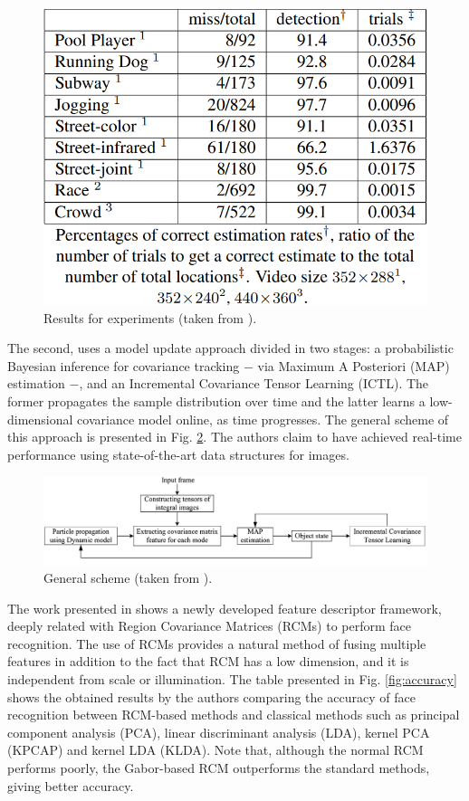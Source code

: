 \documentclass[11pt]{article}
\theoremstyle{definition}
\theoremstyle{remark}
\theoremstyle{remark}
\theoremstyle{remark}
\begin{document}
\begin{figure}[H]
  \centering
  \caption{Results for experiments (taken from \cite{porikli2006covariance}).}
  \label{fig:res_lie}
  \includegraphics[scale=0.3]{res_lie.png}
\end{figure}

The second, uses a model update approach divided in two stages: a probabilistic
Bayesian inference for covariance tracking $-$ via Maximum A Posteriori (MAP)
estimation $-$, and an Incremental Covariance Tensor Learning (ICTL). The former
propagates the sample distribution over time and the latter learns a
low-dimensional covariance model online, as time progresses. The general scheme
of this approach is presented in Fig. \ref{fig:scheme}. The authors claim to
have achieved real-time performance using state-of-the-art data structures for
images.

\begin{figure}[H]
  \centering \includegraphics[scale=0.21]{scheme.png}
  \caption{General scheme (taken from \parencite{wu2012real}).}
  \label{fig:scheme}
\end{figure}


The work presented in \cite{pang2008gabor} shows a newly developed feature
descriptor framework, deeply related with Region Covariance Matrices (RCMs) to
perform face recognition. The use of RCMs provides a natural method of fusing
multiple features in addition to the fact that RCM has a low dimension, and it
is independent from scale or illumination. The table presented in Fig.
\ref{fig:accuracy} shows the obtained results by the authors comparing the
accuracy of face recognition between RCM-based methods and classical methods
such as principal component analysis (PCA), linear discriminant analysis (LDA),
kernel PCA (KPCAP) and kernel LDA (KLDA). Note that, although the normal RCM
performs poorly, the Gabor-based RCM outperforms the standard methods, giving
better accuracy.
\end{document}
